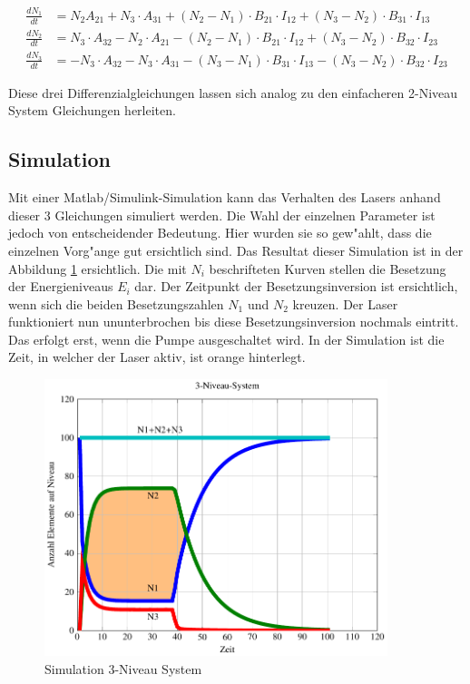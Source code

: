 \begin{refsection}
\begin{align*}
\frac{dN_1}{dt} &=
N_2  A_{21} 
+ N_3 \cdot  A_{31}
+ (N_2 - N_1) \cdot B_{21}\cdot  I_{12}
+ (N_3 - N_2) \cdot B_{31}\cdot  I_{13}\\
\frac{dN_2}{dt} &=
N_3 \cdot  A_{32} 
- N_2 \cdot  A_{21}
- (N_2 - N_1) \cdot  B_{21}\cdot  I_{12}
+ (N_3 - N_2) \cdot  B_{32}\cdot  I_{23}\\
\frac{dN_3}{dt} &=
- N_3 \cdot  A_{32}
- N_3 \cdot  A_{31}
- (N_3 - N_1) \cdot  B_{31}\cdot  I_{13}
- (N_3 - N_2) \cdot  B_{32}\cdot  I_{23}
\end{align*}


Diese drei Differenzialgleichungen lassen sich analog zu den einfacheren
2-Niveau System Gleichungen herleiten.

\subsection{Simulation}
\label{3-Niveau Simulation}
Mit einer Matlab/Simulink-Simulation kann das Verhalten des Lasers anhand
dieser 3 Gleichungen simuliert werden.
Die Wahl der einzelnen Parameter ist jedoch von entscheidender Bedeutung.
Hier wurden sie so gew"ahlt, dass die einzelnen Vorg"ange gut ersichtlich sind.
Das Resultat dieser Simulation ist in der Abbildung
\ref{Simulation 3-Niveau System} ersichtlich.
Die mit $N_i$ beschrifteten Kurven stellen die Besetzung der Energieniveaus
$E_i$ dar.
Der Zeitpunkt der Besetzungsinversion ist ersichtlich, wenn sich die beiden
Besetzungszahlen $N_1$ und $N_2$ kreuzen.
Der Laser funktioniert nun ununterbrochen bis diese Besetzungsinversion
nochmals eintritt.
Das erfolgt erst, wenn die Pumpe ausgeschaltet wird.
In der Simulation ist die Zeit, in welcher der Laser aktiv, ist orange
hinterlegt.

\begin{flushleft}
\begin{figure}
\centering
\includegraphics[width = 10cm]{laser/bilder/3_niveau.pdf}
\caption{Simulation 3-Niveau System}
\label{Simulation 3-Niveau System}


\end{figure}
\end{flushleft}
\end{refsection}

